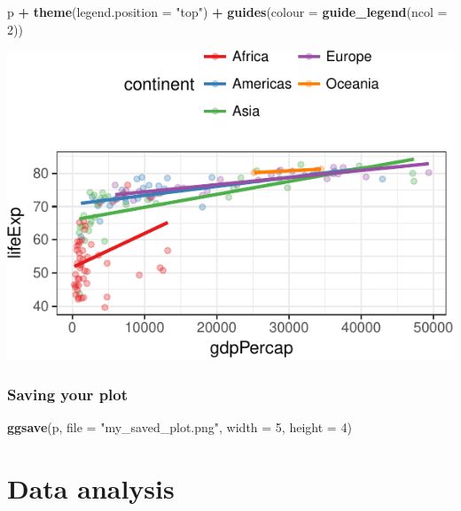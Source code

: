 \documentclass[12pt,]{krantz}
\makeatletter
\newenvironment{Shaded}{\begin{snugshade}}{\end{snugshade}}
\newcommand{\DataTypeTok}[1]{\textcolor[rgb]{0.13,0.29,0.53}{#1}}
\newcommand{\DecValTok}[1]{\textcolor[rgb]{0.00,0.00,0.81}{#1}}
\newcommand{\KeywordTok}[1]{\textcolor[rgb]{0.13,0.29,0.53}{\textbf{#1}}}
\newcommand{\NormalTok}[1]{#1}
\newcommand{\OperatorTok}[1]{\textcolor[rgb]{0.81,0.36,0.00}{\textbf{#1}}}
\newcommand{\StringTok}[1]{\textcolor[rgb]{0.31,0.60,0.02}{#1}}
\newenvironment{kframe}{%
\medskip{}
\setlength{\fboxsep}{.8em}
 \def\at@end@of@kframe{}%
 \ifinner\ifhmode%
  \def\at@end@of@kframe{\end{minipage}}%
  \begin{minipage}{\columnwidth}%
 \fi\fi%
 \def\FrameCommand##1{\hskip\@totalleftmargin \hskip-\fboxsep
 \colorbox{shadecolor}{##1}\hskip-\fboxsep
     \hskip-\linewidth \hskip-\@totalleftmargin \hskip\columnwidth}%
 \MakeFramed {\advance\hsize-\width
   \@totalleftmargin\z@ \linewidth\hsize
   \@setminipage}}%
 {\par\unskip\endMakeFramed%
 \at@end@of@kframe}
\renewenvironment{Shaded}{\begin{kframe}}{\end{kframe}}
\theoremstyle{definition}
\theoremstyle{definition}
\theoremstyle{definition}
\theoremstyle{remark}
\makeatother
\begin{document}
\begin{Shaded}
\begin{Highlighting}[]
\NormalTok{p }\OperatorTok{+}
\StringTok{  }\KeywordTok{theme}\NormalTok{(}\DataTypeTok{legend.position =} \StringTok{"top"}\NormalTok{) }\OperatorTok{+}
\StringTok{  }\KeywordTok{guides}\NormalTok{(}\DataTypeTok{colour =} \KeywordTok{guide_legend}\NormalTok{(}\DataTypeTok{ncol =} \DecValTok{2}\NormalTok{))}
\end{Highlighting}
\end{Shaded}

\includegraphics{05_fine_tuning_plots_files/figure-latex/unnamed-chunk-22-1.pdf}

\hypertarget{saving-your-plot}{%
\section{Saving your plot}\label{saving-your-plot}}

\begin{Shaded}
\begin{Highlighting}[]
\KeywordTok{ggsave}\NormalTok{(p, }\DataTypeTok{file =} \StringTok{"my_saved_plot.png"}\NormalTok{, }\DataTypeTok{width =} \DecValTok{5}\NormalTok{, }\DataTypeTok{height =} \DecValTok{4}\NormalTok{)}
\end{Highlighting}
\end{Shaded}

\hypertarget{part-data-analysis}{%
\part{Data analysis}\label{part-data-analysis}}
\end{document}
